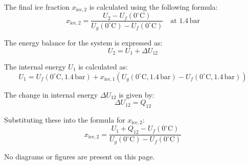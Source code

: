 The final ice fraction \( x_{\text{ice},2} \) is calculated using the following formula:  
\[
x_{\text{ice},2} = \frac{U_2 - U_f(0^\circ\text{C})}{U_g(0^\circ\text{C}) - U_f(0^\circ\text{C})} \quad \text{at } 1.4 \, \text{bar}
\]

The energy balance for the system is expressed as:  
\[
U_2 = U_1 + \Delta U_{12}
\]

The internal energy \( U_1 \) is calculated as:  
\[
U_1 = U_f(0^\circ\text{C}, 1.4 \, \text{bar}) + x_{\text{ice},1} \left( U_g(0^\circ\text{C}, 1.4 \, \text{bar}) - U_f(0^\circ\text{C}, 1.4 \, \text{bar}) \right)
\]

The change in internal energy \( \Delta U_{12} \) is given by:  
\[
\Delta U_{12} = Q_{12}
\]

Substituting these into the formula for \( x_{\text{ice},2} \):  
\[
x_{\text{ice},2} = \frac{U_1 + Q_{12} - U_f(0^\circ\text{C})}{U_g(0^\circ\text{C}) - U_f(0^\circ\text{C})}
\]  

No diagrams or figures are present on this page.